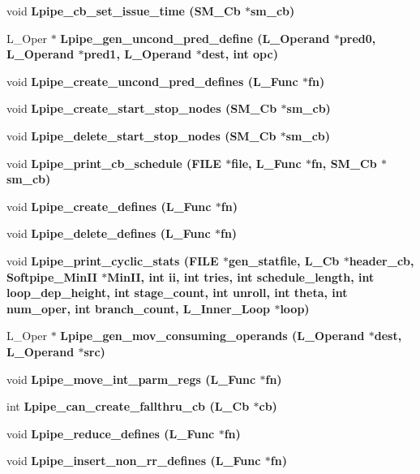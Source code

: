 \begin{CompactItemize}
void \bf{Lpipe\_\-cb\_\-set\_\-issue\_\-time} (\bf{SM\_\-Cb} $\ast$sm\_\-cb)
\item 
L\_\-Oper $\ast$ \bf{Lpipe\_\-gen\_\-uncond\_\-pred\_\-define} (L\_\-Operand $\ast$pred0, L\_\-Operand $\ast$pred1, L\_\-Operand $\ast$dest, int opc)
\item 
void \bf{Lpipe\_\-create\_\-uncond\_\-pred\_\-defines} (L\_\-Func $\ast$fn)
\item 
void \bf{Lpipe\_\-create\_\-start\_\-stop\_\-nodes} (\bf{SM\_\-Cb} $\ast$sm\_\-cb)
\item 
void \bf{Lpipe\_\-delete\_\-start\_\-stop\_\-nodes} (\bf{SM\_\-Cb} $\ast$sm\_\-cb)
\item 
void \bf{Lpipe\_\-print\_\-cb\_\-schedule} (FILE $\ast$file, L\_\-Func $\ast$fn, \bf{SM\_\-Cb} $\ast$sm\_\-cb)
\item 
void \bf{Lpipe\_\-create\_\-defines} (L\_\-Func $\ast$fn)
\item 
void \bf{Lpipe\_\-delete\_\-defines} (L\_\-Func $\ast$fn)
\item 
void \bf{Lpipe\_\-print\_\-cyclic\_\-stats} (FILE $\ast$\bf{gen\_\-statfile}, L\_\-Cb $\ast$\bf{header\_\-cb}, Softpipe\_\-Min\-II $\ast$Min\-II, int ii, int tries, int schedule\_\-length, int \bf{loop\_\-dep\_\-height}, int stage\_\-count, int unroll, int theta, int num\_\-oper, int branch\_\-count, L\_\-Inner\_\-Loop $\ast$loop)
\item 
L\_\-Oper $\ast$ \bf{Lpipe\_\-gen\_\-mov\_\-consuming\_\-operands} (L\_\-Operand $\ast$dest, L\_\-Operand $\ast$src)
\item 
void \bf{Lpipe\_\-move\_\-int\_\-parm\_\-regs} (L\_\-Func $\ast$fn)
\item 
int \bf{Lpipe\_\-can\_\-create\_\-fallthru\_\-cb} (L\_\-Cb $\ast$cb)
\item 
void \bf{Lpipe\_\-reduce\_\-defines} (L\_\-Func $\ast$fn)
\item 
void \bf{Lpipe\_\-insert\_\-non\_\-rr\_\-defines} (L\_\-Func $\ast$fn)
\end{CompactItemize}
